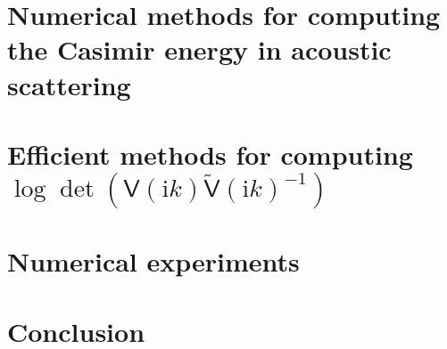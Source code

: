 \documentclass[review]{elsarticle}
\begin{document}
\section{Numerical methods for computing the Casimir energy  in acoustic scattering}\label{Numerical methods for computing the Casimir energy}


% 

\section{Efficient methods for computing $\log\det(\mathsf{V}(\mathrm{i}k)\tilde{\mathsf{V}}(\mathrm{i}k)^{-1})$}\label{Krylov subspace for generalized eigenvalue problem}


\section{Numerical experiments}\label{Numerical experiments}


\section{Conclusion}\label{Conclusion}





\end{document}
